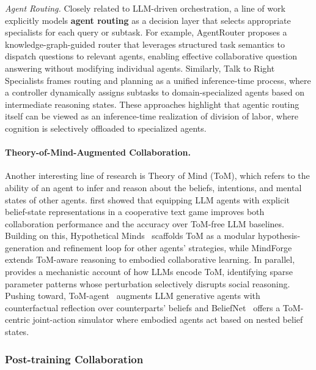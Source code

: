 \emph{Agent Routing.} Closely related to LLM-driven orchestration, a line of work explicitly models \textbf{agent routing} as a decision layer that selects appropriate specialists for each query or subtask. For example, AgentRouter \cite{zhang2025agentrouter} proposes a knowledge-graph-guided router that leverages structured task semantics to dispatch questions to relevant agents, enabling effective collaborative question answering without modifying individual agents. Similarly, Talk to Right Specialists \cite{wu2025talk} frames routing and planning as a unified inference-time process, where a controller dynamically assigns subtasks to domain-specialized agents based on intermediate reasoning states. These approaches highlight that agentic routing itself can be viewed as an inference-time realization of division of labor, where cognition is selectively offloaded to specialized agents.

\paragraph{Theory-of-Mind-Augmented Collaboration.}

Another interesting line of research is Theory of Mind (ToM), which refers to the ability of an agent to infer and reason about the beliefs, intentions, and mental states of other agents. \citet{li2023theory} first showed that equipping LLM agents with explicit belief-state representations in a cooperative text game improves both collaboration performance and the accuracy over ToM-free LLM baselines. Building on this, Hypothetical Minds~\cite{cross2024hypothetical} scaffolds ToM as a modular hypothesis-generation and refinement loop for other agents’ strategies, while MindForge~\cite{licua2024mindforge} extends ToM-aware reasoning to embodied collaborative learning. In parallel, \citet{wu2025large} provides a mechanistic account of how LLMs encode ToM, identifying sparse parameter patterns whose perturbation selectively disrupts social reasoning. Pushing toward, ToM-agent~\cite{yang2025large} augments LLM generative agents with counterfactual reflection over counterparts’ beliefs and BeliefNet~\cite{sagara2025beliefnest} offers a ToM-centric joint-action simulator where embodied agents act based on nested belief states. 




\subsubsection{Post-training Collaboration}

